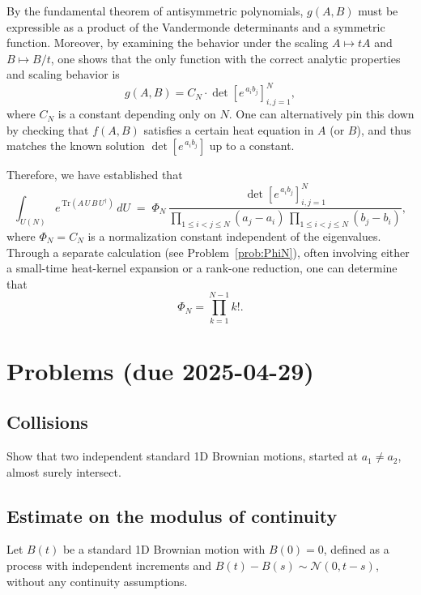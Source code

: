 \documentclass[letterpaper,11pt,oneside,reqno]{article}
\numberwithin{equation}{section}
\theoremstyle{definition}
\begin{document}
By the fundamental theorem of antisymmetric polynomials, $g(A,B)$ must be expressible as a product of the Vandermonde determinants and a symmetric function. Moreover, by examining the behavior under the scaling $A \mapsto tA$ and $B \mapsto B/t$, one shows that the only function with the correct analytic properties and scaling behavior is
\[
   g(A,B) = C_N \cdot \det[e^{\,a_i b_j}]_{i,j=1}^N,
\]
where $C_N$ is a constant depending only on $N$. One can alternatively pin this down by checking that $f(A,B)$ satisfies a certain heat equation in $A$ (or $B$), and thus matches the known solution $\det[e^{\,a_i b_j}]$ up to a constant.

Therefore, we have established that
\[
   \int_{U(N)} e^{\,\mathrm{Tr}(A\,U\,B\,U^\dagger)}\,dU
   \;=\;
   \Phi_N
   \,\frac{\det[e^{\,a_i b_j}]_{i,j=1}^N}{\prod_{1\le i<j\le N}(a_j-a_i)\,\prod_{1\le i<j\le N}(b_j-b_i)},
\]
where $\Phi_N = C_N$ is a normalization constant independent
of the eigenvalues. Through a separate calculation
(see Problem~\ref{prob:PhiN}), often
involving either a small-time heat-kernel expansion or a
rank-one reduction, one can determine that 
\begin{equation}
	\label{eq:PhiN}
   \Phi_N = \prod_{k=1}^{N-1} k!.
 \end{equation}












\appendix
\setcounter{section}{9}
\section{Problems (due 2025-04-29)}

\subsection{Collisions}

Show that two independent standard 1D Brownian motions, started at $a_1\neq a_2$, almost surely intersect.

\subsection{Estimate on the modulus of continuity}

Let $B(t)$ be a standard 1D Brownian motion with $B(0)=0$,
defined as a process with independent increments and $B(t)-B(s)\sim \mathcal{N}(0,t-s)$,
without any continuity assumptions.
\end{document}
